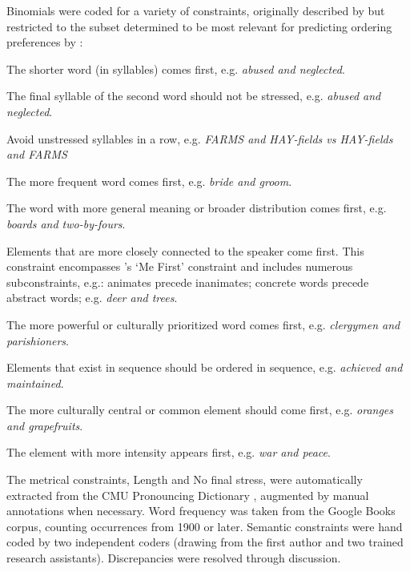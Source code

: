 \documentclass[10pt,letterpaper]{article}
\begin{document}
Binomials were coded for a variety of constraints, originally described by \citet{Benor:2006gv} but restricted to the subset determined to be most relevant for predicting ordering preferences by \citet{Morgan:uMm0l0Ja}:
\begin{description}[noitemsep,style=unboxed,leftmargin=0cm]
  \item[Length] The shorter word (in syllables) comes first, e.g. \emph{abused and neglected}.
  \item[No final stress] The final syllable of the second word should not be stressed, e.g. \emph{abused and neglected}.
  \item[Lapse] Avoid unstressed syllables in a row, e.g. \emph{FARMS and HAY-fields vs HAY-fields and FARMS}
  \item[Frequency] The more frequent word comes first, e.g. \emph{bride and groom}.
  \item[Formal markedness] The word with more general meaning or broader distribution comes first, e.g. \emph{boards and two-by-fours}.
  \item[Perceptual markedness] Elements that are more closely connected to the speaker come first. This constraint encompasses \citeauthor{Cooper:1975uz}'s \citeyearpar{Cooper:1975uz} `Me First' constraint and includes numerous subconstraints, e.g.: animates precede inanimates; concrete words precede abstract words; e.g. \emph{deer and trees}.
  \item[Power] The more powerful or culturally prioritized word comes first, e.g. \emph{clergymen and parishioners}.
  \item[Iconic/scalar sequencing] Elements that exist in sequence should be ordered in sequence, e.g. \emph{achieved and maintained}.
  \item[Cultural Centrality] The more culturally central or common element should come first, e.g. \emph{oranges and grapefruits}.
  \item[Intensity] The element with more intensity appears first, e.g. \emph{war and peace}.
\end{description}
The metrical constraints, Length and No final stress, were automatically extracted from the CMU Pronouncing Dictionary \citeyearpar{TheCMUPronouncing:ZV2ODMTE}, augmented by manual annotations when necessary. Word frequency was taken from the Google Books corpus, counting occurrences from 1900 or later. Semantic constraints were hand coded by two independent coders (drawing from the first author and two trained research assistants). Discrepancies were resolved through discussion.
\end{document}
